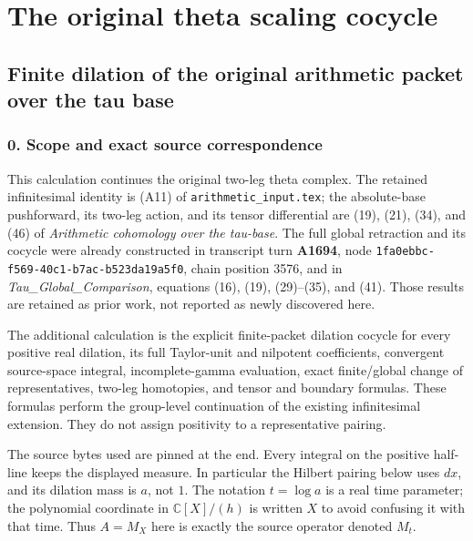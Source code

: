 \documentclass[10pt,a4paper,oneside]{report}
\begin{document}

\endgroup
\clearpage
\chapter{The original theta scaling cocycle}
\begingroup
\section{Finite dilation of the original arithmetic packet over the tau
base}\label{proof04:finite-dilation-of-the-original-arithmetic-packet-over-the-tau-base}

\subsection{0. Scope and exact source
correspondence}\label{proof04:scope-and-exact-source-correspondence}

This calculation continues the original two-leg theta complex. The
retained infinitesimal identity is (A11) of
\texttt{arithmetic\_\allowbreak{}input.tex}; the absolute-base pushforward, its
two-leg action, and its tensor differential are (19), (21), (34), and
(46) of \emph{Arithmetic cohomology over the tau-base}. The full global
retraction and its cocycle were already constructed in transcript turn
\textbf{A1694}, node \texttt{1fa0ebbc-\allowbreak{}f569-\allowbreak{}40c1-\allowbreak{}b7ac-\allowbreak{}b523da19a5f0},
chain position 3576, and in \emph{Tau\_Global\_Comparison}, equations
(16), (19), (29)--(35), and (41). Those results are retained as prior
work, not reported as newly discovered here.

The additional calculation is the explicit finite-packet dilation
cocycle for every positive real dilation, its full Taylor-unit and
nilpotent coefficients, convergent source-space integral,
incomplete-gamma evaluation, exact finite/global change of
representatives, two-leg homotopies, and tensor and boundary formulas.
These formulas perform the group-level continuation of the existing
infinitesimal extension. They do not assign positivity to a
representative pairing.

The source bytes used are pinned at the end. Every integral on the
positive half-line keeps the displayed measure. In particular the
Hilbert pairing below uses \textbf{\(dx\)}, and its dilation mass is
\(a\), not \(1\). The notation \(t=\log a\) is a real time parameter;
the polynomial coordinate in \(\mathbb C[X]/(h)\) is written \(X\) to
avoid confusing it with that time. Thus \(A=M_X\) here is exactly the
source operator denoted \(M_t\).
\end{document}
